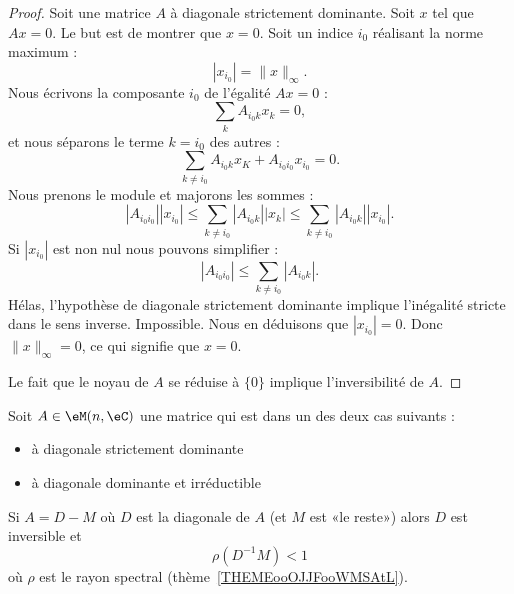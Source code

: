 \begin{proof}
	Soit une matrice \( A\) à diagonale strictement dominante. Soit \( x\) tel que \( Ax=0\). Le but est de montrer que \( x=0\). Soit un indice \( i_0\) réalisant la norme maximum :
	\begin{equation}
		| x_{i_0} |=\| x \|_{\infty}.
	\end{equation}
	Nous écrivons la composante \( i_0\) de l'égalité \( Ax=0\) :
	\begin{equation}
		\sum_kA_{i_0k}x_k=0,
	\end{equation}
	et nous séparons le terme \( k=i_0\) des autres :
	\begin{equation}
		\sum_{k\neq i_0}A_{i_0k}x_K+A_{i_0i_0}x_{i_0}=0.
	\end{equation}
	Nous prenons le module et majorons les sommes :
	\begin{equation}
		| A_{i_0i_0} | |x_{i_0} |\leq \sum_{k\neq i_0}| A_{i_0k} | |x_k |\leq \sum_{k\neq i_0}| A_{i_0k} | |x_{i_0} |.
	\end{equation}
	Si \( | x_{i_0} | \) est non nul nous pouvons simplifier :
	\begin{equation}
		| A_{i_0i_0} |\leq \sum_{k\neq i_0}| A_{i_0k} |.
	\end{equation}
	Hélas, l'hypothèse de diagonale strictement dominante implique l'inégalité stricte dans le sens inverse. Impossible. Nous en déduisons que \( | x_{i_0} |=0\). Donc \( \| x \|_{\infty}=0\), ce qui signifie que \( x=0\).

	Le fait que le noyau de \( A\) se réduise à \( \{ 0 \}\) implique l'inversibilité de \( A\).
\end{proof}

\begin{proposition}     \label{PROPooTQWUooSLoniQ}
	Soit \( A\in \eM(n,\eC)\) une matrice qui est dans un des deux cas suivants :
	\begin{itemize}
		\item à diagonale strictement dominante
		\item à diagonale dominante et irréductible
	\end{itemize}
	Si \( A=D-M\) où \( D\) est la diagonale de \( A\) (et \( M\) est «le reste») alors \( D\) est inversible et
	\begin{equation}
		\rho(D^{-1}M)<1
	\end{equation}
	où \( \rho\) est le rayon spectral (thème~\ref{THEMEooOJJFooWMSAtL}).
\end{proposition}

